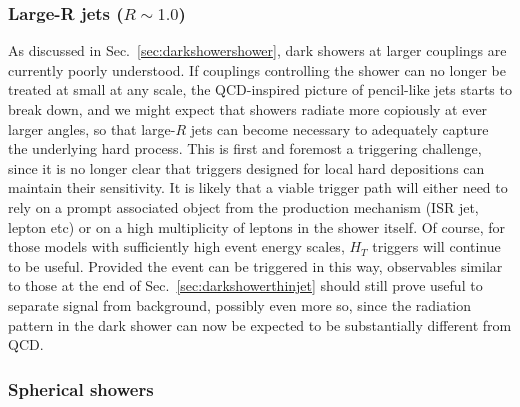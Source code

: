 \subsubsection{Large-R jets ($R \sim 1.0$)}
\label{sec:darkshowerfatjet}

As discussed in Sec.~\ref{sec:darkshowershower}, dark showers at larger couplings are currently poorly understood. If couplings controlling the shower can no longer be treated at small at any scale, the QCD-inspired picture of pencil-like jets starts to break down, and we might expect that showers radiate more copiously at ever larger angles, so that large-$R$ jets can become necessary to adequately capture the underlying hard process. This is first and foremost a triggering challenge, since it is no longer clear that triggers designed for local hard depositions can maintain their sensitivity. It is likely that a viable trigger path will either need to rely on a prompt associated object from the production mechanism (ISR jet, lepton etc) or on a high multiplicity of leptons in the shower itself. Of course, for those models with sufficiently high event energy scales, $H_T$ triggers will continue to be useful. Provided the event can be triggered in this way, observables similar to those at the end of Sec.~\ref{sec:darkshowerthinjet} should still prove useful to separate signal from background, possibly even more so, since the radiation pattern in the dark shower can now be expected to be substantially different from QCD. 


\subsubsection{Spherical showers} %

